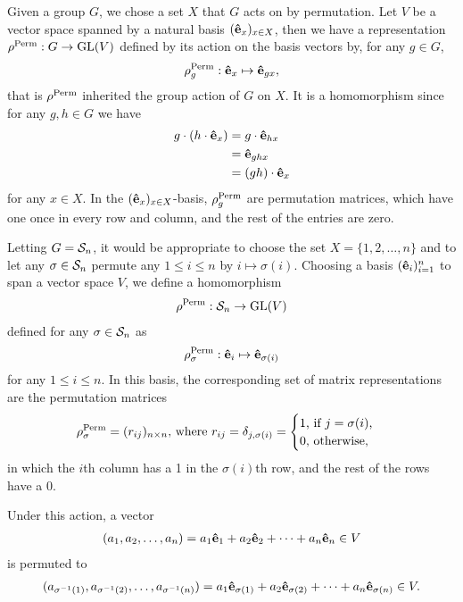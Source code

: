 	Given a group $G$, we chose a set $X$ that $G$ acts on by permutation. Let $V$ be a vector space spanned by a natural basis $(\mathbf{\hat{e}}_x)_{x \in X}$, then we have a representation $\rho^{\text{Perm}} : G \rightarrow \text{GL}(V)$	defined by its action on the basis vectors by, for any $g \in G$, 
	\begin{align*}
		\rho_g^{\text{Perm}} : \mathbf{\hat{e}}_x \mapsto \mathbf{\hat{e}}_{gx},
	\end{align*}
	that is $\rho^{\text{Perm}}$ inherited the group action of $G$ on $X$. It is a homomorphism since for any $g,h \in G$ we have
	{\allowdisplaybreaks\begin{align*}
		g \cdot (h \cdot \mathbf{\hat{e}}_x) &= g \cdot \mathbf{\hat{e}}_{hx} \\
		&= \mathbf{\hat{e}}_{ghx} \\
		&= (gh) \cdot \mathbf{\hat{e}}_x
	\end{align*}}
	for any $x \in X$. %
	In the $(\mathbf{\hat{e}}_x)_{x \in X}$-basis, $\rho_g^{\text{Perm}}$ are permutation matrices, which have one once in every row and column, and the rest of the entries are zero.
	
	Letting $G = \mathcal{S}_n$, it would be appropriate to choose the set $X = \{1, 2, \dots, n\}$ and to let any $\sigma \in \mathcal{S}_n$ permute any $1 \leq i \leq n$ by $i \mapsto \sigma(i)$. Choosing a basis $(\mathbf{\hat{e}}_i)_{i=1}^n$ to span a vector space $V$, we define a homomorphism
	\begin{align*}
		\rho^{\text{Perm}}: \mathcal{S}_n \rightarrow \text{GL}(V)
	\end{align*}
	defined for any $\sigma \in \mathcal{S}_n$ as
	\begin{align*}
		\rho_\sigma^{\text{Perm}}: \mathbf{\hat{e}}_i \mapsto \mathbf{\hat{e}}_{\sigma(i)}
	\end{align*}
	for any $1 \leq i \leq n$. In this basis, the corresponding set of matrix representations are the permutation matrices
	\begin{align*}
		\rho_\sigma^{\text{Perm}} = (r_{ij})_{n \times n} \text{, where } r_{ij} = \delta_{j,\sigma(i)} = \begin{cases}
			1 \text{, if $j = \sigma(i)$,} \\
			0 \text{, otherwise,}
		\end{cases}
	\end{align*}
	in which the $i$th column has a 1 in the $\sigma(i)$th row, and the rest of the rows have a 0.
	
	Under this action, a vector
	\begin{align*}
		(a_1, a_2, \dots, a_n) = a_1 \mathbf{\hat{e}}_1 + a_2 \mathbf{\hat{e}}_2 + \dots + a_n \mathbf{\hat{e}}_n \in V
	\end{align*}
	is permuted to 
	\begin{align*}
		(a_{\sigma^{-1}(1)}, a_{\sigma^{-1}(2)}, \dots, a_{\sigma^{-1}(n)}) = a_1 \mathbf{\hat{e}}_{\sigma(1)} + a_2 \mathbf{\hat{e}}_{\sigma(2)} + \dots + a_n \mathbf{\hat{e}}_{\sigma(n)}  \in V.
	\end{align*}
	
